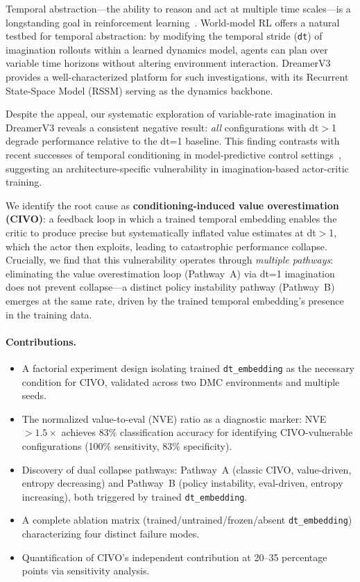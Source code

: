 \documentclass[10pt,letterpaper]{article}
\begin{document}
Temporal abstraction---the ability to reason and act at multiple time scales---is a longstanding goal in reinforcement learning~\citep{sutton1999options,vezhnevets2017feudal}.
World-model RL offers a natural testbed for temporal abstraction: by modifying the temporal stride (\texttt{dt}) of imagination rollouts within a learned dynamics model, agents can plan over variable time horizons without altering environment interaction.
DreamerV3~\citep{hafner2023dreamerv3} provides a well-characterized platform for such investigations, with its Recurrent State-Space Model (RSSM) serving as the dynamics backbone.

Despite the appeal, our systematic exploration of variable-rate imagination in DreamerV3 reveals a consistent negative result: \emph{all} configurations with dt$>$1 degrade performance relative to the dt=1 baseline.
This finding contrasts with recent successes of temporal conditioning in model-predictive control settings~\citep{nhu2025tawm}, suggesting an architecture-specific vulnerability in imagination-based actor-critic training.

We identify the root cause as \textbf{conditioning-induced value overestimation (CIVO)}: a feedback loop in which a trained temporal embedding enables the critic to produce precise but systematically inflated value estimates at dt$>$1, which the actor then exploits, leading to catastrophic performance collapse.
Crucially, we find that this vulnerability operates through \emph{multiple pathways}: eliminating the value overestimation loop (Pathway~A) via dt=1 imagination does not prevent collapse---a distinct policy instability pathway (Pathway~B) emerges at the same rate, driven by the trained temporal embedding's presence in the training data.

\paragraph{Contributions.}
\begin{itemize}
    \item A factorial experiment design isolating trained \texttt{dt\_embedding} as the necessary condition for CIVO, validated across two DMC environments and multiple seeds.
    \item The normalized value-to-eval (NVE) ratio as a diagnostic marker: NVE~$>1.5\times$ achieves 83\% classification accuracy for identifying CIVO-vulnerable configurations (100\% sensitivity, 83\% specificity).
    \item Discovery of dual collapse pathways: Pathway~A (classic CIVO, value-driven, entropy decreasing) and Pathway~B (policy instability, eval-driven, entropy increasing), both triggered by trained \texttt{dt\_embedding}.
    \item A complete ablation matrix (trained/untrained/frozen/absent \texttt{dt\_embedding}) characterizing four distinct failure modes.
    \item Quantification of CIVO's independent contribution at 20--35 percentage points via sensitivity analysis.
\end{itemize}
\end{document}
